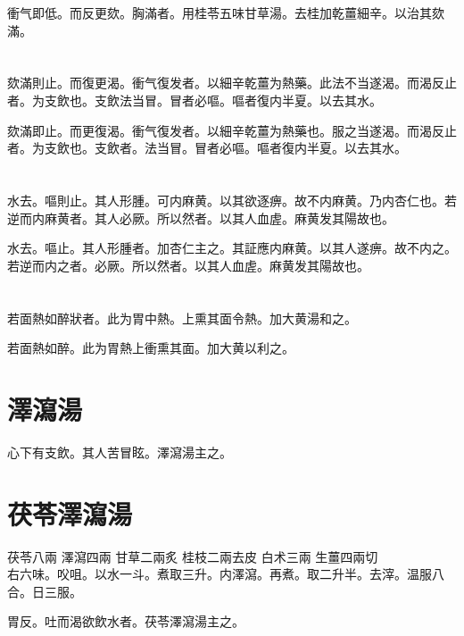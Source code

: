 衝气即低。而反更欬。胸滿者。用桂苓五味甘草湯。去桂加乾薑細辛。以治其欬滿。{\dengben}

\section{}

欬滿則止。而復更渴。衝气復发者。以細辛乾薑为熱藥。此法不当遂渴。而渴反止者。为支飲也。支飲法当冒。冒者必嘔。嘔者復内半夏。以去其水。{\wuben}

欬滿即止。而更復渴。衝气復发者。以細辛乾薑为熱藥也。服之当遂渴。而渴反止者。为支飲也。支飲者。法当冒。冒者必嘔。嘔者復内半夏。以去其水。{\dengben}

\section{}

水去。嘔則止。其人形腫。可内麻黄。以其欲逐痹。故不内麻黄。乃内杏仁也。若逆而内麻黄者。其人必厥。所以然者。以其人血虗。麻黄发其陽故也。{\wuben}

水去。嘔止。其人形腫者。加杏仁主之。其証應内麻黄。以其人遂痹。故不内之。若逆而内之者。必厥。所以然者。以其人血虗。麻黄发其陽故也。{\dengben}

\section{}

若面熱如醉狀者。此为胃中熱。上熏其面令熱。加大黄湯和之。{\wuben}

若面熱如醉。此为胃熱上衝熏其面。加大黄以利之。{\dengben}

\section{澤瀉湯}

心下有支飲。其人苦冒眩。澤瀉湯主之。

\section{茯苓澤瀉湯}

茯苓{\scriptsize 八兩} 澤瀉{\scriptsize 四兩} 甘草{\scriptsize 二兩炙} 桂枝{\scriptsize 二兩去皮} 白术{\scriptsize 三兩} 生薑{\scriptsize 四兩切}\\
右六味。㕮咀。以水一斗。煮取三升。内澤瀉。再煮。取二升半。去滓。温服八合。日三服。

胃反。吐而渴欲飲水者。茯苓澤瀉湯主之。

